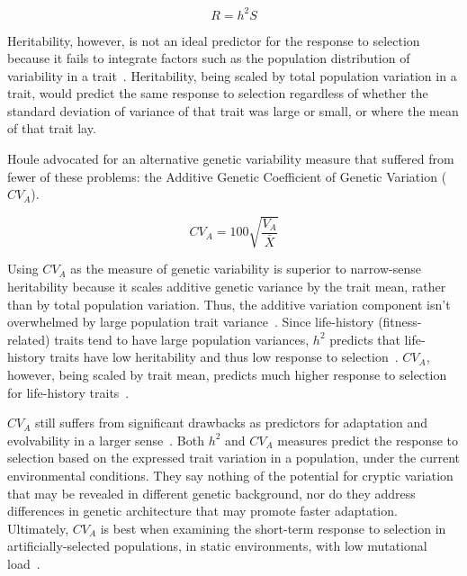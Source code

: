 \documentclass[PhD]{msu-thesis}
\begin{document}
\begin{equation}
R = {h^2}S
\end{equation}

Heritability, however, is not an ideal predictor for the response to selection because it fails to integrate factors such as the population distribution of variability in a trait~\cite{houle_comparing_1992}. Heritability, being scaled by total population variation in a trait, would predict the same response to selection regardless of whether the standard deviation of variance of that trait was large or small, or where the mean of that trait lay.

Houle advocated for an alternative genetic variability measure that suffered from fewer of these problems: the Additive Genetic Coefficient of Genetic Variation ($CV_A$).

\begin{equation}
CV_A = 100\sqrt{\frac{V_A}{\bar X}}
\end{equation}

Using $CV_A$ as the measure of genetic variability is superior to narrow-sense heritability because it scales additive genetic variance by the trait mean, rather than by total population variation. Thus, the additive variation component isn’t overwhelmed by large population trait variance~\cite{hansen_measuring_2008}. Since life-history (fitness-related) traits tend to have large population variances, $h^2$ predicts that life-history traits have low heritability and thus low response to selection~\cite{price_low_1991}. $CV_A$, however, being scaled by trait mean, predicts much higher response to selection for life-history traits~\cite{hansen_heritability_2011,houle_comparing_1992}.

$CV_A$ still suffers from significant drawbacks as predictors for adaptation and evolvability in a larger sense~\cite{hansen_heritability_2011}. Both $h^2$ and $CV_A$ measures predict the response to selection based on the expressed trait variation in a population, under the current environmental conditions. They say nothing of the potential for cryptic variation that may be revealed in different genetic background, nor do they address differences in genetic architecture that may promote faster adaptation. Ultimately, $CV_A$ is best when examining the short-term response to selection in artificially-selected populations, in static environments, with low mutational load~\cite{houle_comparing_1992}.
\end{document}
